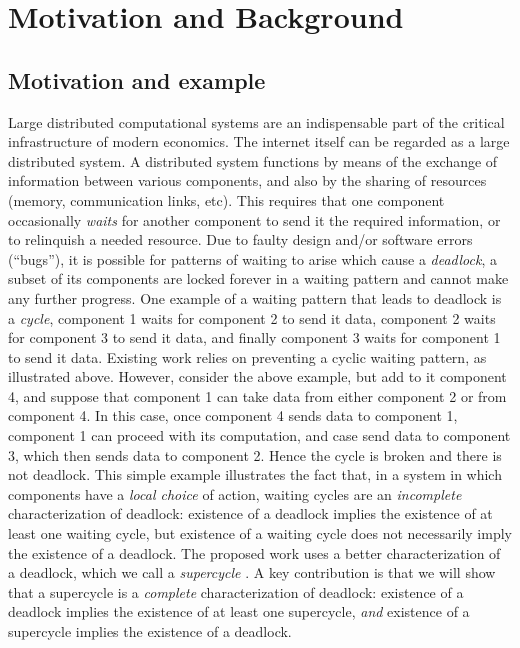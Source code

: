 \section{Motivation and Background}

\subsection{Motivation and example}

Large distributed computational systems are an indispensable part of the
critical infrastructure of modern economics. The internet itself can be regarded
as a large distributed system.  A distributed system functions by means of the
exchange of information between various components, and also by the sharing of
resources (\eg memory, communication links, etc). This requires that one
component occasionally \emph{waits} for another component to send it the required
information, or to relinquish a needed resource.  Due to faulty design and/or
software errors (``bugs''), it is possible for patterns of waiting to arise
which cause a {\em deadlock}, \ie a subset of its components are locked forever
in a waiting pattern and cannot make any further progress.
%
One example of a waiting pattern that leads to deadlock is a \emph{cycle}, \eg component 1 waits for component 2 to send it data, 
component 2 waits for component 3 to send it data, and finally 
component 3 waits for component 1 to send it data.
%
Existing work relies on preventing a cyclic waiting pattern, as illustrated above. However, consider the above example, but add to it component 4,
and suppose that component 1 can take data from either component 2 or from component 4. In this case, once component 4 sends data to component 1,
component 1 can proceed with its computation, and case send data to component 3, which then sends data to component 2. Hence the cycle is broken and
there is not deadlock.
%
This simple example illustrates the fact that, in a system in which components have a \emph{local choice} of action, waiting cycles are an
\emph{incomplete} characterization of deadlock: existence of a deadlock implies the existence of at least one waiting cycle, but existence of a
waiting cycle does not necessarily imply the existence of a deadlock.
%
The proposed work uses a better characterization of a deadlock, which we call a \emph{supercycle} \cite{FORTE13}. 
A key contribution is that we will show that a supercycle is a 
\emph{complete} characterization of deadlock: existence of a deadlock implies the existence of at least one supercycle, \emph{and} existence of a
supercycle implies the existence of a deadlock.

